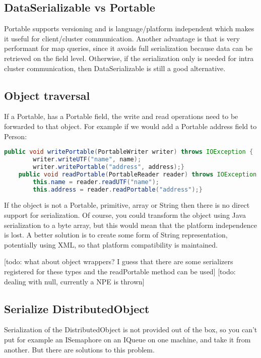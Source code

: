 \subsection{DataSerializable vs Portable}
Portable supports versioning and is language/platform independent which makes it useful for client/cluster communication. Another advantage is that is very performant for map queries, since it avoids full serialization because data can be retrieved on the field level. Otherwise, if the serialization only is needed for intra cluster communication, then DataSerializable is still a good alternative.

\subsection*{Object traversal}
If a Portable, has a Portable field, the write and read operations need to be forwarded to that object. For example if we would add a Portable address field to Person:
\begin{lstlisting}[language=java]
    public void writePortable(PortableWriter writer) throws IOException {
        writer.writeUTF("name", name);
        writer.writePortable("address", address);}
    public void readPortable(PortableReader reader) throws IOException {
        this.name = reader.readUTF("name");
        this.address = reader.readPortable("address");}
\end{lstlisting}

If the object is not a Portable, primitive, array or String then there is no direct support for serialization. Of course, you could transform the object using Java serialization to a byte array, but this would mean that the platform independence is lost. A better solution  is to create some form of String representation, potentially using XML, so that platform compatibility is maintained.

[todo: what about object wrappers? I guess that there are some serializers registered for these types and the readPortable method can be used]
[todo: dealing with null, currently a NPE is thrown]

\subsection*{Serialize DistributedObject}
Serialization of the DistributedObject is not provided out of the box, so you can't put for example an ISemaphore on an IQueue on one machine, and take it from another. But there are solutions to this problem.

